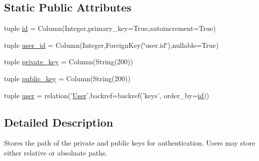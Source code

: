 \subsection*{\-Static \-Public \-Attributes}
\begin{DoxyCompactItemize}
\item 
tuple \hyperlink{classcyberweb_1_1model_1_1resource_1_1_auth_key_a5972771c45a25eef871b81504cec76b9}{id} = \-Column(\-Integer,primary\-\_\-key=\-True,autoincrement=\-True)
\item 
tuple \hyperlink{classcyberweb_1_1model_1_1resource_1_1_auth_key_a8356da032afe905866a1fb1afd466625}{user\-\_\-id} = \-Column(\-Integer,\-Foreign\-Key(\char`\"{}user.\-id\char`\"{}),nullable=\-True)
\item 
tuple \hyperlink{classcyberweb_1_1model_1_1resource_1_1_auth_key_a8a2801ef2d80d6e27f9989c407ed845e}{private\-\_\-key} = \-Column(\-String(200))
\item 
tuple \hyperlink{classcyberweb_1_1model_1_1resource_1_1_auth_key_a05efaacc2d0ced8d1dea25b97aa8fad7}{public\-\_\-key} = \-Column(\-String(200))
\item 
tuple \hyperlink{classcyberweb_1_1model_1_1resource_1_1_auth_key_afe01d6b47e9f6aa78019e308521520a0}{user} = relation('\hyperlink{classcyberweb_1_1model_1_1user_1_1_user}{\-User}',backref=backref('keys', order\-\_\-by=\hyperlink{classcyberweb_1_1model_1_1resource_1_1_auth_key_a5972771c45a25eef871b81504cec76b9}{id}))
\end{DoxyCompactItemize}


\subsection{\-Detailed \-Description}
\begin{DoxyVerb}
Stores the path of the private and public keys for authentication. Users may store either
relative or absoluate paths.
    \end{DoxyVerb}
 

